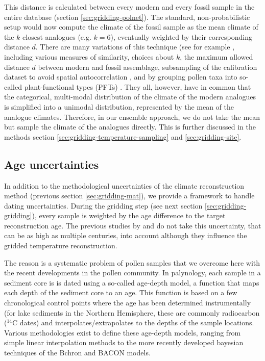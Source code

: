 \begin{refsection}
This distance is calculated between every modern and every fossil sample in the entire database (section \ref{sec:gridding-polnet}). The standard, non-probabilistic setup would now compute the climate of the fossil sample as the mean climate of the $k$ closest analogues (e.g. $k = 6$), eventually weighted by their corresponding distance $d$. There are many variations of this technique (see for example \cite{BirksHeiriSeppaeEtAl2010}, including various measures of similarity, choices about $k$, the maximum allowed distance $d$ between modern and fossil assemblage, subsampling of the calibration dataset to avoid spatial autocorrelation \citep{GuiotVernal2011, TelfordBirks2009, TelfordBirks2005}, and by grouping pollen taxa into so-called plant-functional types (PFTs) \citep[e.g.]{DavisBrewerStevensonEtAl2003, MauriDavisCollinsEtAl2015}. They all, however, have in common that the categorical, multi-modal distribution of the climate of the modern analogues is simplified into a unimodal distribution, represented by the mean of the analogue climates. Therefore, in our ensemble approach, we do not take the mean but sample the climate of the analogues directly. This is further discussed in the methods section \ref{sec:gridding-temperature-sampling} and \ref{sec:gridding-site}.


\subsection{Age uncertainties}  \label{sec:gridding-ageunc}
In addition to the methodological uncertainties of the climate reconstruction method (previous section \ref{sec:gridding-mat}), we provide a framework to handle dating uncertainties. During the gridding step (see next section \ref{sec:gridding-gridding}), every sample is weighted by the age difference to the target reconstruction age. The previous studies by \cite{DavisBrewerStevensonEtAl2003} and \cite{MauriDavisCollinsEtAl2015} do not take this uncertainty, that can be as high as multiple centuries, into account although they influence the gridded temperature reconstruction.

The reason is a systematic problem of pollen samples that we overcome here with the recent developments in the pollen community. In palynology, each sample in a sediment core is is dated using a so-called age-depth model, a function that maps each depth of the sediment core to an age. This function is based on a few chronological control points where the age has been determined instrumentally (for lake sediments in the Northern Hemisphere, these are commonly radiocarbon ($^{14}$C dates) and interpolates/extrapolates to the depths of the sample locations. Various methodologies exist to define these age-depth models, ranging from simple linear interpolation methods \citep{Bennett1994} to the more recently developed bayesian techniques of the Bchron \citep{HaslettParnell2008} and BACON \citep{BlaauwChristen2011} models.


\end{refsection}

